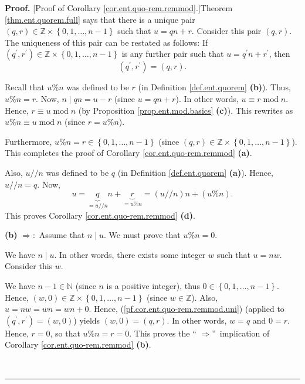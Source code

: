\documentclass[numbers=enddot,12pt,final,onecolumn,notitlepage]{scrartcl}%
\numberwithin{exer}{subsection}
\theoremstyle{definition}
\newenvironment{proof}[1][Proof]{\noindent\textbf{#1.} }{\ \rule{0.5em}{0.5em}}
\begin{document}
\begin{proof}
[Proof of Corollary \ref{cor.ent.quo-rem.remmod}.]Theorem
\ref{thm.ent.quorem.full} says that there is a unique pair $\left(
q,r\right)  \in\mathbb{Z}\times\left\{  0,1,\ldots,n-1\right\}  $ such that
$u=qn+r$. Consider this pair $\left(  q,r\right)  $. The uniqueness of this
pair can be restated as follows: If $\left(  q^{\prime},r^{\prime}\right)
\in\mathbb{Z}\times\left\{  0,1,\ldots,n-1\right\}  $ is any further pair such
that $u=q^{\prime}n+r^{\prime}$, then%
\begin{equation}
\left(  q^{\prime},r^{\prime}\right)  =\left(  q,r\right)  .
\label{pf.cor.ent.quo-rem.remmod.uni}%
\end{equation}


Recall that $u\%n$ was defined to be $r$ (in Definition \ref{def.ent.quorem}
\textbf{(b)}). Thus, $u\%n=r$. Now, $n\mid qn=u-r$ (since $u=qn+r$). In other
words, $u\equiv r\operatorname{mod}n$. Hence, $r\equiv u\operatorname{mod}n$
(by Proposition \ref{prop.ent.mod.basics} \textbf{(c)}). This rewrites as
$u\%n\equiv u\operatorname{mod}n$ (since $r=u\%n$).

Furthermore, $u\%n=r\in\left\{  0,1,\ldots,n-1\right\}  $ (since $\left(
q,r\right)  \in\mathbb{Z}\times\left\{  0,1,\ldots,n-1\right\}  $). This
completes the proof of Corollary \ref{cor.ent.quo-rem.remmod} \textbf{(a)}.

Also, $u//n$ was defined to be $q$ (in Definition \ref{def.ent.quorem}
\textbf{(a)}). Hence, $u//n=q$. Now,%
\[
u=\underbrace{q}_{=u//n}n+\underbrace{r}_{=u\%n}=\left(  u//n\right)
n+\left(  u\%n\right)  .
\]
This proves Corollary \ref{cor.ent.quo-rem.remmod} \textbf{(d)}.

\textbf{(b)} $\Longrightarrow:$ Assume that $n\mid u$. We must prove that
$u\%n=0$.

We have $n\mid u$. In other words, there exists some integer $w$ such that
$u=nw$. Consider this $w$.

We have $n-1\in\mathbb{N}$ (since $n$ is a positive integer), thus
$0\in\left\{  0,1,\ldots,n-1\right\}  $. Hence, $\left(  w,0\right)
\in\mathbb{Z}\times\left\{  0,1,\ldots,n-1\right\}  $ (since $w\in\mathbb{Z}%
$). Also, $u=nw=wn=wn+0$. Hence, (\ref{pf.cor.ent.quo-rem.remmod.uni})
(applied to $\left(  q^{\prime},r^{\prime}\right)  =\left(  w,0\right)  $)
yields $\left(  w,0\right)  =\left(  q,r\right)  $. In other words, $w=q$ and
$0=r$. Hence, $r=0$, so that $u\%n=r=0$. This proves the \textquotedblleft%
$\Longrightarrow$\textquotedblright\ implication of Corollary
\ref{cor.ent.quo-rem.remmod} \textbf{(b)}.


\end{proof}
\end{document}
